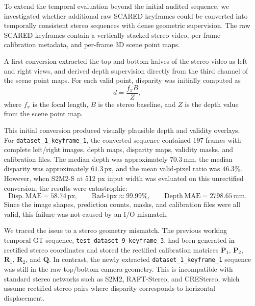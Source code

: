 \documentclass[11pt,a4paper]{article}
\begin{document}
To extend the temporal evaluation beyond the initial audited sequence, we investigated whether additional raw SCARED keyframes could be converted into temporally consistent stereo sequences with dense geometric supervision. The raw SCARED keyframes contain a vertically stacked stereo video, per-frame calibration metadata, and per-frame 3D scene point maps.

A first conversion extracted the top and bottom halves of the stereo video as left and right views, and derived depth supervision directly from the third channel of the scene point maps. For each valid point, disparity was initially computed as
\begin{equation}
    d = \frac{f_x B}{Z},
\end{equation}
where \(f_x\) is the focal length, \(B\) is the stereo baseline, and \(Z\) is the depth value from the scene point map.

This initial conversion produced visually plausible depth and validity overlays. For \texttt{dataset\_1\_keyframe\_1}, the converted sequence contained 197 frames with complete left/right images, depth maps, disparity maps, validity masks, and calibration files. The median depth was approximately \(70.3\,\mathrm{mm}\), the median disparity was approximately \(61.3\,\mathrm{px}\), and the mean valid-pixel ratio was \(46.3\%\). However, when S2M2-S at 512 px input width was evaluated on this unrectified conversion, the results were catastrophic:
\begin{equation}
    \mathrm{Disp.\ MAE} = 58.74\,\mathrm{px},
    \qquad
    \mathrm{Bad\text{-}1px} \approx 99.99\%,
    \qquad
    \mathrm{Depth\ MAE} = 2798.65\,\mathrm{mm}.
\end{equation}
Since the image shapes, prediction counts, masks, and calibration files were all valid, this failure was not caused by an I/O mismatch.

We traced the issue to a stereo geometry mismatch. The previous working temporal-GT sequence, \texttt{test\_dataset\_9\_keyframe\_3}, had been generated in rectified stereo coordinates and stored the rectified calibration matrices \(\mathbf{P}_1\), \(\mathbf{P}_2\), \(\mathbf{R}_1\), \(\mathbf{R}_2\), and \(\mathbf{Q}\). In contrast, the newly extracted \texttt{dataset\_1\_keyframe\_1} sequence was still in the raw top/bottom camera geometry. This is incompatible with standard stereo networks such as S2M2, RAFT-Stereo, and CREStereo, which assume rectified stereo pairs where disparity corresponds to horizontal displacement.
\end{document}
